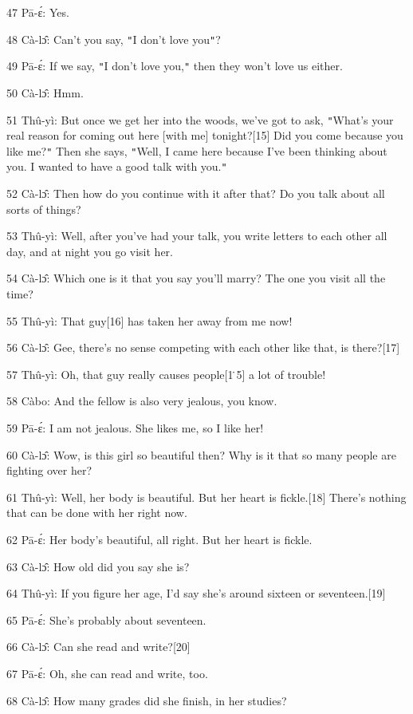 {47 Pā-ɛ́: Yes.}

{48 Cà-lɔ̂: Can't you say, \texttt{"}I don't love you\texttt{"}?}

{49 Pā-ɛ́: If we say, \texttt{"}I don't love you,\texttt{"} then they
won't love us either.}

{50 Cà-lɔ̂: Hmm.}

{51 Thû-yì: But once we get her into the woods, we've got to ask, \texttt{"}What's
your real reason for coming out here [with me] tonight?[15] Did you come because
you like me?\texttt{"} Then she says, \texttt{"}Well, I came here because I've
been thinking about you. I wanted to have a good talk with you.\texttt{"} }

{52 Cà-lɔ̂: Then how do you continue with it after that? Do you talk
about all sorts of things?}

{53 Thû-yì: Well, after you've had your talk, you write letters to each
other all day, and at night you go visit her. }

{54 Cà-lɔ̂: Which one is it that you say you'll marry? The one you visit
all the time? }

{55 Thû-yì: That guy[16] has taken her away from me now!}

{56 Cà-lɔ̂: Gee, there's no sense competing with each other like that,
is there?[17]}

{57 Thû-yì: Oh, that guy really causes people[1\.5] a lot of trouble!}

{58 Càbo: And the fellow is also very jealous, you know. }

{59 Pā-ɛ́: I am not jealous. She likes me, so I like her!}

{60 Cà-lɔ̂: Wow, is this girl so beautiful then? Why is it that so many
people are fighting over her?}

{61 Thû-yì: Well, her body is beautiful. But her heart is fickle.[18]
There's nothing that can be done with her right now. }

{62 Pā-ɛ́: Her body's beautiful, all right. But her heart is fickle.}

{63 Cà-lɔ̂: How old did you say she is?}

{64 Thû-yì: If you figure her age, I'd say she's around sixteen or seventeen.[19]}

{65 Pā-ɛ́: She's probably about seventeen.}

{66 Cà-lɔ̂: Can she read and write?[20]}

{67 Pā-ɛ́: Oh, she can read and write, too.}

{68 Cà-lɔ̂: How many grades did she finish, in her studies?}

